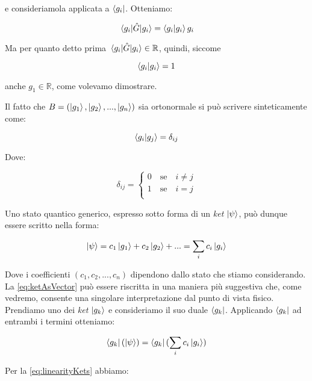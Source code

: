 e consideriamola applicata a $\bra{g_i}$. Otteniamo:

    \begin{equation}
        \mel{g_i}{\hat{G}}{g_i} = \braket{g_i}{g_i}g_i
    \end{equation}
    
Ma per quanto detto prima $\mel{g_i}{\hat{G}}{g_i} \in \mathbb{R}$, quindi, siccome

    \[
        \braket{g_i}{g_i} = 1
    \]
    
anche $g_1 \in \mathbb{R}$, come volevamo dimostrare.
    
Il fatto che $B = ( \ket{g_1}, \ket{g_2}, ..., \ket{g_n} ) $ sia ortonormale si può scrivere sinteticamente come: 

	\begin{equation} \label{eq:orthonormalBasis}
		\braket{g_i}{g_j} = \delta_{ij}
	\end{equation}

Dove:

 	\begin{equation}
		\delta_{ij} = \left \{ \begin{array}{l}
				0 \quad \text{se} \quad i \neq j \\
				1 \quad \text{se} \quad i = j \\
			\end{array}
		\right.
	\end{equation}


Uno stato quantico generico, espresso sotto forma di un \textit{ket} $\ket{\psi}$, può dunque essere scritto nella forma:

	\begin{equation} \label{eq:ketAsVector}
		\ket{\psi} = c_1 \ket{g_1} + c_2 \ket{g_2} + ... = \sum_i c_i \ket{g_i}
	\end{equation}

Dove i coefficienti $(c_1, c_2, ..., c_n)$ dipendono dallo stato che stiamo considerando. La \eqref{eq:ketAsVector} può essere riscritta in una maniera più suggestiva che, come vedremo, consente una singolare interpretazione dal punto di vista fisico. Prendiamo uno dei \textit{ket} $\ket{g_k}$ e consideriamo il suo duale $\bra{g_k}$. Applicando $\bra{g_k}$ ad entrambi i termini otteniamo:

	\begin{equation}
		\bra{g_k}(\ket{\psi}) = \bra{g_k}(\sum_i c_i \ket{g_i})
	\end{equation}

Per la \eqref{eq:linearityKets} abbiamo:

